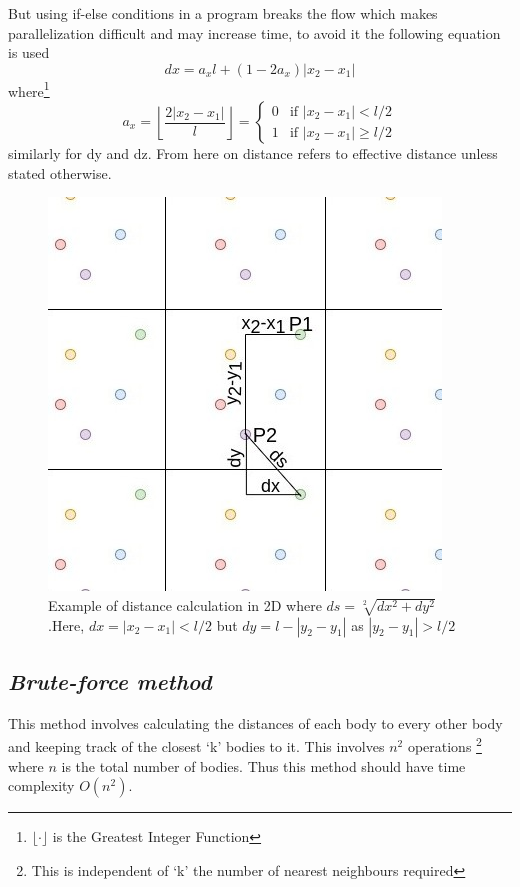 \documentclass[twocolumn,11pt]{article}
\begin{document}
But using if-else conditions in a program breaks the flow which makes parallelization difficult and may increase time, to avoid it the following equation is used\\
\begin{equation} 
dx = a_xl + (1 - 2a_{x})|x_2 - x_1|
\end{equation}
where\footnote{ $\lfloor \cdot \rfloor$ is the Greatest Integer Function}
\begin{equation}
a_x = \left\lfloor \frac{2|x_2-x_1|}{l} \right\rfloor = \begin{cases}
0 &\text{if } |x_2-x_1| < l/2 \\
1 &\text{if } |x_2-x_1| \ge l/2
\end{cases}
\end{equation}
similarly for dy and dz. From here on distance refers to effective distance unless stated otherwise.

\begin{figure}
\centering
	\includegraphics[width=0.85\linewidth]{dcalc}
	\caption{\small{Example of distance calculation in 2D where \( ds = \sqrt[2]{dx^2 + dy^2} \) .Here, $dx=|x_2-x_1| < l/2 $ but $dy=l - |y_2-y_1|$ as $|y_2-y_1|>l/2$}}
	\label{fig3}
\end{figure}

\subsection{\textit{Brute-force method}}
This method involves calculating the distances of each body to every other body and keeping track of the closest `k' bodies to it. This involves \( n^2 \) operations \footnote{This is independent of `k' the number of nearest neighbours required} where \(n\) is the total number of bodies. Thus this method should have time complexity $O(n^{2})$.
\end{document}
